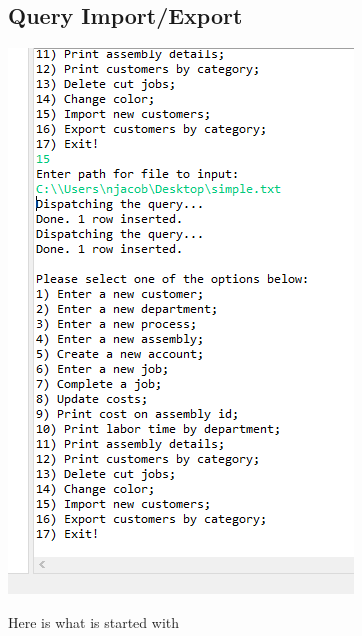 \documentclass[11pt]{article}
\begin{document}
\subsection{Query Import/Export}

\includegraphics[width = \textwidth]{insert.png}

Here is what is started with

\end{document}
